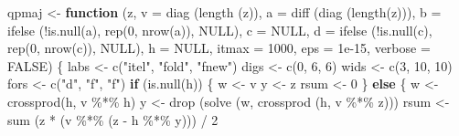 \documentclass[
  12pt,
  letterpaper,
  DIV=11,
  numbers=noendperiod]{scrreprt}
\newenvironment{Shaded}{\begin{snugshade}}{\end{snugshade}}
\newcommand{\AttributeTok}[1]{\textcolor[rgb]{0.40,0.45,0.13}{#1}}
\newcommand{\ConstantTok}[1]{\textcolor[rgb]{0.56,0.35,0.01}{#1}}
\newcommand{\ControlFlowTok}[1]{\textcolor[rgb]{0.00,0.23,0.31}{\textbf{#1}}}
\newcommand{\DecValTok}[1]{\textcolor[rgb]{0.68,0.00,0.00}{#1}}
\newcommand{\FloatTok}[1]{\textcolor[rgb]{0.68,0.00,0.00}{#1}}
\newcommand{\FunctionTok}[1]{\textcolor[rgb]{0.28,0.35,0.67}{#1}}
\newcommand{\NormalTok}[1]{\textcolor[rgb]{0.00,0.23,0.31}{#1}}
\newcommand{\OtherTok}[1]{\textcolor[rgb]{0.00,0.23,0.31}{#1}}
\newcommand{\SpecialCharTok}[1]{\textcolor[rgb]{0.37,0.37,0.37}{#1}}
\newcommand{\StringTok}[1]{\textcolor[rgb]{0.13,0.47,0.30}{#1}}
\theoremstyle{remark}
\begin{document}
\begin{Shaded}
\begin{Highlighting}[]
\NormalTok{qpmaj }\OtherTok{\textless{}{-}}
  \ControlFlowTok{function}\NormalTok{ (z,}
            \AttributeTok{v =} \FunctionTok{diag}\NormalTok{ (}\FunctionTok{length}\NormalTok{ (z)),}
            \AttributeTok{a =} \FunctionTok{diff}\NormalTok{ (}\FunctionTok{diag}\NormalTok{ (}\FunctionTok{length}\NormalTok{(z))),}
            \AttributeTok{b =} \FunctionTok{ifelse}\NormalTok{ (}\SpecialCharTok{!}\FunctionTok{is.null}\NormalTok{(a), }\FunctionTok{rep}\NormalTok{(}\DecValTok{0}\NormalTok{, }\FunctionTok{nrow}\NormalTok{(a)), }\ConstantTok{NULL}\NormalTok{),}
            \AttributeTok{c =} \ConstantTok{NULL}\NormalTok{,}
            \AttributeTok{d =} \FunctionTok{ifelse}\NormalTok{ (}\SpecialCharTok{!}\FunctionTok{is.null}\NormalTok{(c), }\FunctionTok{rep}\NormalTok{(}\DecValTok{0}\NormalTok{, }\FunctionTok{nrow}\NormalTok{(c)), }\ConstantTok{NULL}\NormalTok{),}
            \AttributeTok{h =} \ConstantTok{NULL}\NormalTok{,}
            \AttributeTok{itmax =} \DecValTok{1000}\NormalTok{,}
            \AttributeTok{eps =} \FloatTok{1e{-}15}\NormalTok{,}
            \AttributeTok{verbose =} \ConstantTok{FALSE}\NormalTok{) \{}
\NormalTok{    labs }\OtherTok{\textless{}{-}} \FunctionTok{c}\NormalTok{(}\StringTok{"itel"}\NormalTok{, }\StringTok{"fold"}\NormalTok{, }\StringTok{"fnew"}\NormalTok{)}
\NormalTok{    digs }\OtherTok{\textless{}{-}} \FunctionTok{c}\NormalTok{(}\DecValTok{0}\NormalTok{, }\DecValTok{6}\NormalTok{, }\DecValTok{6}\NormalTok{)}
\NormalTok{    wids }\OtherTok{\textless{}{-}} \FunctionTok{c}\NormalTok{(}\DecValTok{3}\NormalTok{, }\DecValTok{10}\NormalTok{, }\DecValTok{10}\NormalTok{)}
\NormalTok{    fors }\OtherTok{\textless{}{-}} \FunctionTok{c}\NormalTok{(}\StringTok{"d"}\NormalTok{, }\StringTok{"f"}\NormalTok{, }\StringTok{"f"}\NormalTok{)}
    \ControlFlowTok{if}\NormalTok{ (}\FunctionTok{is.null}\NormalTok{(h)) \{}
\NormalTok{      w }\OtherTok{\textless{}{-}}\NormalTok{ v}
\NormalTok{      y }\OtherTok{\textless{}{-}}\NormalTok{ z}
\NormalTok{      rsum }\OtherTok{\textless{}{-}} \DecValTok{0}
\NormalTok{    \} }\ControlFlowTok{else}\NormalTok{ \{}
\NormalTok{      w }\OtherTok{\textless{}{-}} \FunctionTok{crossprod}\NormalTok{(h, v }\SpecialCharTok{\%*\%}\NormalTok{ h)}
\NormalTok{      y }\OtherTok{\textless{}{-}} \FunctionTok{drop}\NormalTok{ (}\FunctionTok{solve}\NormalTok{ (w, }\FunctionTok{crossprod}\NormalTok{ (h, v }\SpecialCharTok{\%*\%}\NormalTok{ z)))}
\NormalTok{      rsum }\OtherTok{\textless{}{-}} \FunctionTok{sum}\NormalTok{ (z }\SpecialCharTok{*}\NormalTok{ (v }\SpecialCharTok{\%*\%}\NormalTok{ (z }\SpecialCharTok{{-}}\NormalTok{ h }\SpecialCharTok{\%*\%}\NormalTok{ y))) }\SpecialCharTok{/} \DecValTok{2}

\end{Highlighting}
\end{Shaded}
\end{document}
